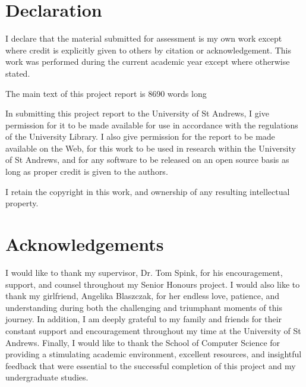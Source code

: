 \chapter*{Declaration}
I declare that the material submitted for assessment is my own work except
where credit is explicitly given to others by citation or acknowledgement. This
work was performed during the current academic year except where otherwise
stated.

The main text of this project report is 8690 words long

In submitting this project report to the University of St Andrews, I give
permission for it to be made available for use in accordance with the
regulations of the University Library. I also give permission for the report to
be made available on the Web, for this work to be used in research within the
University of St Andrews, and for any software to be released on an open source
basis as long as proper credit is given to the authors.


I retain the copyright in this work, and ownership of any resulting intellectual property.

{\let\clearpage\relax \chapter*{Acknowledgements}}
I would like to thank my supervisor, Dr. Tom Spink, for his encouragement, support, and counsel throughout my Senior Honours project. I would also like to thank my girlfriend, Angelika Blaszczak, for her endless love, patience, and understanding during both the challenging and triumphant moments of this journey. In addition, I am deeply grateful to my family and friends for their constant support and encouragement throughout my time at the University of St Andrews. Finally, I would like to thank the School of Computer Science for providing a stimulating academic environment, excellent resources, and insightful feedback that were essential to the successful completion of this project and my undergraduate studies.
